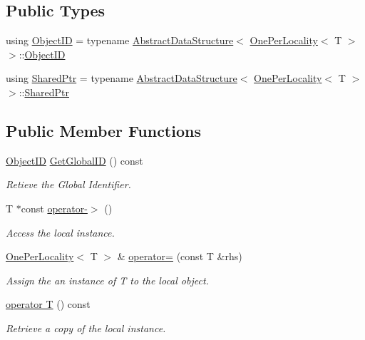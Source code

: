 \subsection*{Public Types}
\begin{DoxyCompactItemize}
\item 
using \hyperlink{classshad_1_1OnePerLocality_a60e8354048763662cb04eaab1b063977}{Object\-I\-D} = typename \hyperlink{classshad_1_1AbstractDataStructure}{Abstract\-Data\-Structure}$<$ \hyperlink{classshad_1_1OnePerLocality}{One\-Per\-Locality}$<$ T $>$$>$\-::\hyperlink{classshad_1_1OnePerLocality_a60e8354048763662cb04eaab1b063977}{Object\-I\-D}
\item 
using \hyperlink{classshad_1_1OnePerLocality_ad3a4f471e9d1fe8998bf783553c92d52}{Shared\-Ptr} = typename \hyperlink{classshad_1_1AbstractDataStructure}{Abstract\-Data\-Structure}$<$ \hyperlink{classshad_1_1OnePerLocality}{One\-Per\-Locality}$<$ T $>$$>$\-::\hyperlink{classshad_1_1OnePerLocality_ad3a4f471e9d1fe8998bf783553c92d52}{Shared\-Ptr}
\end{DoxyCompactItemize}
\subsection*{Public Member Functions}
\begin{DoxyCompactItemize}
\item 
\hyperlink{classshad_1_1OnePerLocality_a60e8354048763662cb04eaab1b063977}{Object\-I\-D} \hyperlink{classshad_1_1OnePerLocality_a83cb9589b89f27f1befc3ae669098c9c}{Get\-Global\-I\-D} () const 
\begin{DoxyCompactList}\small\item\em Retieve the Global Identifier. \end{DoxyCompactList}\item 
T $\ast$const \hyperlink{classshad_1_1OnePerLocality_a95a07b2c6d17140554f52112059b3d61}{operator-\/$>$} ()
\begin{DoxyCompactList}\small\item\em Access the local instance. \end{DoxyCompactList}\item 
\hyperlink{classshad_1_1OnePerLocality}{One\-Per\-Locality}$<$ T $>$ \& \hyperlink{classshad_1_1OnePerLocality_a82c608896e00521bffcba78fe7a0b88b}{operator=} (const T \&rhs)
\begin{DoxyCompactList}\small\item\em Assign the an instance of T to the local object. \end{DoxyCompactList}\item 
\hyperlink{classshad_1_1OnePerLocality_a721063d9435318f629e415b098643b19}{operator T} () const 
\begin{DoxyCompactList}\small\item\em Retrieve a copy of the local instance. \end{DoxyCompactList}\end{DoxyCompactItemize}
